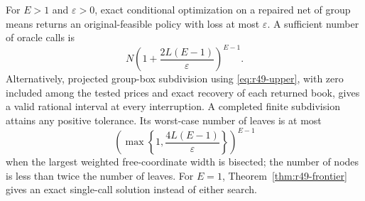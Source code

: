 \begin{theorem}\label{thm:r49-accuracy}
For $E>1$ and $\varepsilon>0$, exact conditional optimization on a repaired net of group means returns an original-feasible policy with loss at most $\varepsilon$. A sufficient number of oracle calls is
\begin{equation}\label{eq:r49-net-count}
 N\left(1+\frac{2L(E-1)}{\varepsilon}\right)^{E-1}.
\end{equation}
Alternatively, projected group-box subdivision using \eqref{eq:r49-upper}, with zero included among the tested prices and exact recovery of each returned book, gives a valid rational interval at every interruption. A completed finite subdivision attains any positive tolerance. Its worst-case number of leaves is at most
\begin{equation}\label{eq:r49-cover-count}
 \left(\max\left\{1,\frac{4L(E-1)}{\varepsilon}\right\}\right)^{E-1}
\end{equation}
when the largest weighted free-coordinate width is bisected; the number of nodes is less than twice the number of leaves. For $E=1$, Theorem~\ref{thm:r49-frontier} gives an exact single-call solution instead of either search.
\end{theorem}
